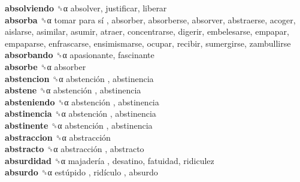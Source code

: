 \textbf{absolviendo} ␝α  absolver, justificar, liberar  \\
\textbf{absorba} ␝α   tomar para sí , absorber, absorberse, absorver, abstraerse, acoger, aislarse, asimilar, asumir, atraer, concentrarse, digerir, embelesarse, empapar, empaparse, enfrascarse, ensimismarse, ocupar, recibir, sumergirse, zambullirse  \\
\textbf{absorbando} ␝α  apasionante, fascinante  \\
\textbf{absorbe} ␝α  absorber  \\
\textbf{abstencion} ␝α   abstención , abstinencia  \\
\textbf{abstene} ␝α   abstención , abstinencia  \\
\textbf{absteniendo} ␝α   abstención , abstinencia  \\
\textbf{abstinencia} ␝α   abstención , abstinencia  \\
\textbf{abstinente} ␝α   abstención , abstinencia  \\
\textbf{abstraccion} ␝α   abstracción   \\
\textbf{abstracto} ␝α   abstracción , abstracto  \\
\textbf{absurdidad} ␝α   majadería , desatino, fatuidad, ridiculez  \\
\textbf{absurdo} ␝α   estúpido ,  ridículo , absurdo  \\
